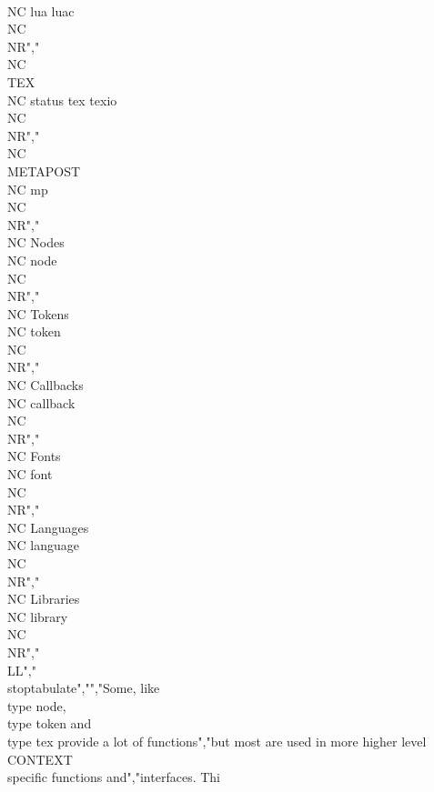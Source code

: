    \\NC lua luac         \\NC \\NR","\\NC \\TEX      \\NC status tex texio \\NC \\NR","\\NC \\METAPOST \\NC mp               \\NC \\NR","\\NC Nodes     \\NC node             \\NC \\NR","\\NC Tokens    \\NC token            \\NC \\NR","\\NC Callbacks \\NC callback         \\NC \\NR","\\NC Fonts     \\NC font             \\NC \\NR","\\NC Languages \\NC language         \\NC \\NR","\\NC Libraries \\NC library          \\NC \\NR","\\LL","\\stoptabulate","","Some, like \\type {node}, \\type {token} and \\type {tex} provide a lot of functions","but most are used in more higher level \\CONTEXT\\ specific functions and","interfaces. Thi